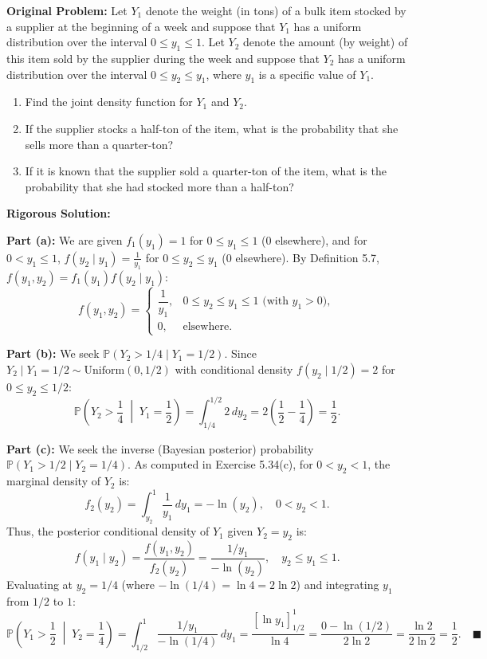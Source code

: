 \documentclass[11pt, letterpaper]{article}
\theoremstyle{definition}
\theoremstyle{remark}
\newcommand{\Prob}{\mathbb{P}}
\begin{document}
\textbf{Original Problem:}
Let $Y_1$ denote the weight (in tons) of a bulk item stocked by a supplier at the beginning of a week and suppose that $Y_1$ has a uniform distribution over the interval $0 \le y_1 \le 1$. Let $Y_2$ denote the amount (by weight) of this item sold by the supplier during the week and suppose that $Y_2$ has a uniform distribution over the interval $0 \le y_2 \le y_1$, where $y_1$ is a specific value of $Y_1$.
\begin{enumerate}[label=\textbf{\alph*}]
    \item Find the joint density function for $Y_1$ and $Y_2$.
    \item If the supplier stocks a half-ton of the item, what is the probability that she sells more than a quarter-ton?
    \item If it is known that the supplier sold a quarter-ton of the item, what is the probability that she had stocked more than a half-ton?
\end{enumerate}

\textbf{Rigorous Solution:}

\textbf{Part (a):} We are given $f_1(y_1) = 1$ for $0 \le y_1 \le 1$ ($0$ elsewhere), and for $0 < y_1 \le 1$, $f(y_2 \mid y_1) = \frac{1}{y_1}$ for $0 \le y_2 \le y_1$ ($0$ elsewhere). By Definition 5.7, $f(y_1, y_2) = f_1(y_1)f(y_2 \mid y_1)$:
\[ f(y_1, y_2) = \begin{cases} \dfrac{1}{y_1}, & 0 \le y_2 \le y_1 \le 1 \text{ (with } y_1 > 0\text{)}, \\ 0, & \text{elsewhere.} \end{cases} \]

\textbf{Part (b):} We seek $\Prob(Y_2 > 1/4 \mid Y_1 = 1/2)$. Since $Y_2 \mid Y_1 = 1/2 \sim \text{Uniform}(0, 1/2)$ with conditional density $f(y_2 \mid 1/2) = 2$ for $0 \le y_2 \le 1/2$:
\[ \Prob\left(Y_2 > \frac{1}{4} \;\middle|\; Y_1 = \frac{1}{2}\right) = \int_{1/4}^{1/2} 2 \, dy_2 = 2\left(\frac{1}{2} - \frac{1}{4}\right) = \frac{1}{2}. \]

\textbf{Part (c):} We seek the inverse (Bayesian posterior) probability $\Prob(Y_1 > 1/2 \mid Y_2 = 1/4)$. As computed in Exercise 5.34(c), for $0 < y_2 < 1$, the marginal density of $Y_2$ is:
\[ f_2(y_2) = \int_{y_2}^1 \frac{1}{y_1} \, dy_1 = -\ln(y_2), \quad 0 < y_2 < 1. \]
Thus, the posterior conditional density of $Y_1$ given $Y_2 = y_2$ is:
\[ f(y_1 \mid y_2) = \frac{f(y_1, y_2)}{f_2(y_2)} = \frac{1/y_1}{-\ln(y_2)}, \quad y_2 \le y_1 \le 1. \]
Evaluating at $y_2 = 1/4$ (where $-\ln(1/4) = \ln 4 = 2\ln 2$) and integrating $y_1$ from $1/2$ to $1$:
\[ \Prob\left(Y_1 > \frac{1}{2} \;\middle|\; Y_2 = \frac{1}{4}\right) = \int_{1/2}^1 \frac{1/y_1}{-\ln(1/4)} \, dy_1 = \frac{\left[\ln y_1\right]_{1/2}^1}{\ln 4} = \frac{0 - \ln(1/2)}{2\ln 2} = \frac{\ln 2}{2\ln 2} = \frac{1}{2}. \quad \blacksquare \]
\end{document}
